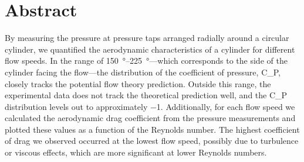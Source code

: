 \thispagestyle{plain} %



\chapter*{Abstract} %

By measuring the pressure at pressure taps arranged radially around a circular cylinder, we quantified the aerodynamic characteristics of a cylinder for different flow speeds. In the range of \qtyrange{150}{225}{\degree}—which corresponds to the side of the cylinder facing the flow—the distribution of the coefficient of pressure, \gls{C_P}, closely tracks the potential flow theory prediction. Outside this range, the experimental data does not track the theoretical prediction well, and the \gls{C_P} distribution levels out to approximately \num{-1}. Additionally, for each flow speed we calculated the aerodynamic drag coefficient from the pressure measurements and plotted these values as a function of the Reynolds number. The highest coefficient of drag we observed occurred at the lowest flow speed, possibly due to turbulence or viscous effects, which are more significant at lower Reynolds numbers.

